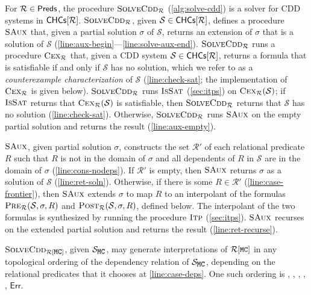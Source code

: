 %
For $\mathcal{R} \in \mathsf{Preds}$, the procedure $\textsc{SolveCdd}_{ \mathcal{R}
}$ (\autoref{alg:solve-cdd}) is a solver for CDD systems in $\mathsf{CHCs}[ 
  \mathcal{R}  ]$.
%
$\textsc{SolveCdd}_{ \mathcal{R} }$, given $\mathcal{S} \in \mathsf{CHCs}[  \mathcal{R}
 ]$, defines a procedure $\textsc{SAux}$ that, given a partial solution
$\sigma$ of $\mathcal{S}$, returns an extension of $\sigma$ that is a
solution of $\mathcal{S}$
(\autoref{line:aux-begin}---\autoref{line:solve-aux-end}).
%
$\textsc{SolveCdd}_{ \mathcal{R} }$ runs a procedure $\textsc{Cex}_{ \mathcal{R} }$ that,
given a CDD system $\mathcal{S} \in \mathsf{CHCs}[  \mathcal{R}  ]$, returns a
formula that is satisfiable if and only if $\mathcal{S}$ has no
solution, which we refer to as a \emph{counterexample
  characterization} of $\mathcal{S}$ (\autoref{line:check-sat};
%
the implementation of $\textsc{Cex}_{ \mathcal{R} }$ is given below).
%
$\textsc{SolveCdd}_{ \mathcal{R} }$ runs $\textsc{IsSat}$ (\autoref{sec:itps}) on $\textsc{Cex}_{
  \mathcal{R} }(\mathcal{S})$;
%
if $\textsc{IsSat}$ returns that $\textsc{Cex}_{ \mathcal{R} }(\mathcal{S})$ is
satisfiable, then $\textsc{SolveCdd}_{ \mathcal{R} }$ returns that
$\mathcal{S}$ has no solution (\autoref{line:check-sat}).
Otherwise, $\textsc{SolveCdd}_{ \mathcal{R} }$ runs $\textsc{SAux}$ on the empty
partial solution and returns the result (\autoref{line:aux-empty}).

$\textsc{SAux}$, given partial solution $\sigma$, constructs the set
$\mathcal{R}'$ of each relational predicate $R$ such that $R$ is not
in the domain of $\sigma$ and all dependents of $R$ in $\mathcal{S}$
are in the domain of $\sigma$ (\autoref{line:cons-nodeps}).
%
If $\mathcal{R}'$ is empty, then $\textsc{SAux}$ returns $\sigma$ as a
solution of $\mathcal{S}$ (\autoref{line:ret-soln}).
%
Otherwise, if there is some $R \in \mathcal{R}'$
(\autoref{line:case-frontier}), then $\textsc{SAux}$ extends $\sigma$ to
map $R$ to an interpolant of the formulas $\textsc{Pre}_{ \mathcal{R}
}(\mathcal{S}, \sigma, R)$ and $\textsc{Post}_{ \mathcal{R} }(\mathcal{S},
\sigma, R)$, defined below.
%
The interpolant of the two formulas is synthesized by running the
procedure $\textsc{Itp}$ (\autoref{sec:itps}).
%
$\textsc{SAux}$ recurses on the extended partial solution and returns the
result (\autoref{line:ret-recurse}).
%
\begin{ex}
  $\solvecdd{ \mcpreds }$, given $\mcchc$, may generate
  interpretations of $\mcpreds$ in any topological ordering of the
  dependency relation of $\mcchc$, depending on the relational
  predicates that it chooses at \autoref{line:case-deps}.
  One such ordering is , , , , ,
  $\mathsf{Err}$.
\end{ex}

